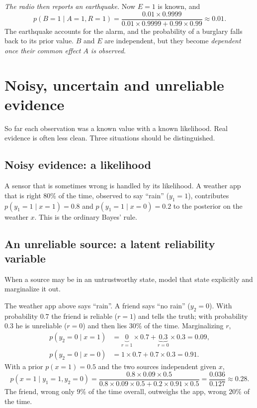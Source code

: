 \begin{notechapter}
\begin{example}
\emph{The radio then reports an earthquake.} Now $E = 1$ is known, and
\[
  p(B = 1\mid A = 1, R = 1) = \frac{0.01\times0.9999}{0.01\times0.9999 + 0.99\times0.99}\approx0.01 .
\]
The earthquake accounts for the alarm, and the probability of a burglary falls
back to its prior value. $B$ and $E$ are independent, but they become
\emph{dependent once their common effect $A$ is observed}.
\end{example}

\section{Noisy, uncertain and unreliable evidence}\label{bayesian-reasoning:sec:evidence}

So far each observation was a known value with a known likelihood. Real evidence
is often less clean. Three situations should be distinguished.

\subsection{Noisy evidence: a likelihood}

A sensor that is sometimes wrong is handled by its likelihood. A weather app that
is right $80\%$ of the time, observed to say ``rain'' ($y_1 = 1$), contributes
$p(y_1 = 1\mid x = 1) = 0.8$ and $p(y_1 = 1\mid x = 0) = 0.2$ to the posterior on
the weather $x$. This is the ordinary Bayes' rule.

\subsection{An unreliable source: a latent reliability variable}

When a source may be in an untrustworthy state, model that state explicitly and
marginalize it out.

\begin{example}[Is it raining?]\label{bayesian-reasoning:ex:rain}
The weather app above says ``rain''. A friend says ``no rain'' ($y_2 = 0$).
With probability $0.7$ the friend is reliable ($r = 1$) and tells the truth; with
probability $0.3$ he is unreliable ($r = 0$) and then lies $30\%$ of the time.
Marginalizing $r$,
\begin{align*}
  p(y_2 = 0\mid x = 1) &= \underbrace{0}_{r=1}\times0.7 + \underbrace{0.3}_{r=0}\times0.3 = 0.09,\\
  p(y_2 = 0\mid x = 0) &= 1\times0.7 + 0.7\times0.3 = 0.91 .
\end{align*}
With a prior $p(x = 1) = 0.5$ and the two sources independent given $x$,
\[
  p(x = 1\mid y_1 = 1, y_2 = 0) = \frac{0.8\times0.09\times0.5}{0.8\times0.09\times0.5 + 0.2\times0.91\times0.5}
  = \frac{0.036}{0.127}\approx0.28 .
\]
The friend, wrong only $9\%$ of the time overall, outweighs the app, wrong $20\%$
of the time.
\end{example}


\end{notechapter}
